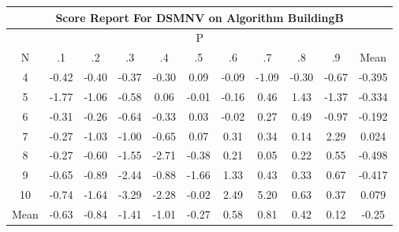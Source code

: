 \documentclass[11pt,a4paper]{report}
\begin{document}
\begin{longtable}{ | c || c | c | c | c | c | c | c | c | c || c |}
\hline
\multicolumn{11}{|c|}{ Score Report For DSMNV on Algorithm BuildingB} \\
\hline
\multicolumn{11}{|c|}{ P } \\
\hline
N & .1 & .2 & .3 & .4 & .5 & .6 & .7 & .8 & .9 & Mean\\
 \hline
 \hline
 \endhead
  4 &  \cellcolor[HTML]{FFF7F7} -0.42 &  \cellcolor[HTML]{FFF7F7} -0.40 &  \cellcolor[HTML]{FFF7F7} -0.37 &  \cellcolor[HTML]{FFF7F7} -0.30 &  \cellcolor[HTML]{FFFFFF} 0.09 &  \cellcolor[HTML]{FFFFFF} -0.09 &  \cellcolor[HTML]{FFE7E7} -1.09 &  \cellcolor[HTML]{FFF7F7} -0.30 &  \cellcolor[HTML]{FFEFEF} -0.67 & -0.395 \\
  5 &  \cellcolor[HTML]{FFCFCF} -1.77 &  \cellcolor[HTML]{FFE7E7} -1.06 &  \cellcolor[HTML]{FFEFEF} -0.58 &  \cellcolor[HTML]{FFFFFF} 0.06 &  \cellcolor[HTML]{FFFFFF} -0.01 &  \cellcolor[HTML]{FFF7F7} -0.16 &  \cellcolor[HTML]{F7F7FF} 0.46 &  \cellcolor[HTML]{D7D7FF} 1.43 &  \cellcolor[HTML]{FFDFDF} -1.37 & -0.334 \\
  6 &  \cellcolor[HTML]{FFF7F7} -0.31 &  \cellcolor[HTML]{FFF7F7} -0.26 &  \cellcolor[HTML]{FFEFEF} -0.64 &  \cellcolor[HTML]{FFF7F7} -0.33 &  \cellcolor[HTML]{FFFFFF} 0.03 &  \cellcolor[HTML]{FFFFFF} -0.02 &  \cellcolor[HTML]{F7F7FF} 0.27 &  \cellcolor[HTML]{EFEFFF} 0.49 &  \cellcolor[HTML]{FFE7E7} -0.97 & -0.192 \\
  7 &  \cellcolor[HTML]{FFF7F7} -0.27 &  \cellcolor[HTML]{FFE7E7} -1.03 &  \cellcolor[HTML]{FFE7E7} -1.00 &  \cellcolor[HTML]{FFEFEF} -0.65 &  \cellcolor[HTML]{FFFFFF} 0.07 &  \cellcolor[HTML]{F7F7FF} 0.31 &  \cellcolor[HTML]{F7F7FF} 0.34 &  \cellcolor[HTML]{FFFFFF} 0.14 &  \cellcolor[HTML]{C7C7FF} 2.29 & 0.024 \\
  8 &  \cellcolor[HTML]{FFF7F7} -0.27 &  \cellcolor[HTML]{FFEFEF} -0.60 &  \cellcolor[HTML]{FFD7D7} -1.55 &  \cellcolor[HTML]{FFB7B7} -2.71 &  \cellcolor[HTML]{FFF7F7} -0.38 &  \cellcolor[HTML]{F7F7FF} 0.21 &  \cellcolor[HTML]{FFFFFF} 0.05 &  \cellcolor[HTML]{F7F7FF} 0.22 &  \cellcolor[HTML]{EFEFFF} 0.55 & -0.498 \\
  9 &  \cellcolor[HTML]{FFEFEF} -0.65 &  \cellcolor[HTML]{FFE7E7} -0.89 &  \cellcolor[HTML]{FFBFBF} -2.44 &  \cellcolor[HTML]{FFE7E7} -0.88 &  \cellcolor[HTML]{FFD7D7} -1.66 &  \cellcolor[HTML]{DFDFFF} 1.33 &  \cellcolor[HTML]{F7F7FF} 0.43 &  \cellcolor[HTML]{F7F7FF} 0.33 &  \cellcolor[HTML]{EFEFFF} 0.67 & -0.417 \\
  10 &  \cellcolor[HTML]{FFEFEF} -0.74 &  \cellcolor[HTML]{FFD7D7} -1.64 &  \cellcolor[HTML]{FFAFAF} -3.29 &  \cellcolor[HTML]{FFC7C7} -2.28 &  \cellcolor[HTML]{FFFFFF} -0.02 &  \cellcolor[HTML]{BFBFFF} 2.49 &  \cellcolor[HTML]{8080FF} 5.20 &  \cellcolor[HTML]{EFEFFF} 0.63 &  \cellcolor[HTML]{F7F7FF} 0.37 & 0.079 \\
 \hline
 \hline
Mean &  \cellcolor[HTML]{FFEFEF} -0.63 &  \cellcolor[HTML]{FFE7E7} -0.84 &  \cellcolor[HTML]{FFDFDF} -1.41 &  \cellcolor[HTML]{FFE7E7} -1.01 &  \cellcolor[HTML]{FFF7F7} -0.27 &  \cellcolor[HTML]{EFEFFF} 0.58 &  \cellcolor[HTML]{E7E7FF} 0.81 &  \cellcolor[HTML]{F7F7FF} 0.42 &  \cellcolor[HTML]{FFFFFF} 0.12 &  \cellcolor[HTML]{FFF7F7} -0.25
\end{longtable}
\end{document}
